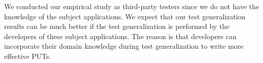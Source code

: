 We conducted our empirical study as third-party testers since we do not have the knowledge of the subject applications. We expect that our test generalization results can be much better if the test generalization is performed by the developers of these subject applications. The reason is that developers can incorporate their domain knowledge during test generalization to write more effective PUTs.



